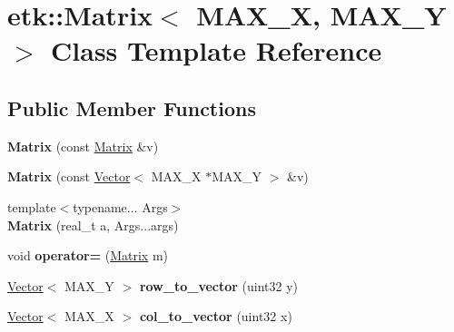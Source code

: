 \hypertarget{classetk_1_1_matrix}{\section{etk\-:\-:Matrix$<$ M\-A\-X\-\_\-\-X, M\-A\-X\-\_\-\-Y $>$ Class Template Reference}
\label{classetk_1_1_matrix}
}
\subsection*{Public Member Functions}
\begin{DoxyCompactItemize}
\item 
\hypertarget{classetk_1_1_matrix_a0242991f55f1e1696e59ea79831d3209}{{\bfseries Matrix} (const \hyperlink{classetk_1_1_matrix}{Matrix} \&v)}\label{classetk_1_1_matrix_a0242991f55f1e1696e59ea79831d3209}

\item 
\hypertarget{classetk_1_1_matrix_a5a291855a1c2bf5f83c151a2dbfc6c15}{{\bfseries Matrix} (const \hyperlink{classetk_1_1_vector}{Vector}$<$ M\-A\-X\-\_\-\-X $\ast$M\-A\-X\-\_\-\-Y $>$ \&v)}\label{classetk_1_1_matrix_a5a291855a1c2bf5f83c151a2dbfc6c15}

\item 
\hypertarget{classetk_1_1_matrix_a720277b96fac48caa56bb15e85d96aa1}{{\footnotesize template$<$typename... Args$>$ }\\{\bfseries Matrix} (real\-\_\-t a, Args...\-args)}\label{classetk_1_1_matrix_a720277b96fac48caa56bb15e85d96aa1}

\item 
\hypertarget{classetk_1_1_matrix_a31163e3aba16e2becc41e9b6810aaf56}{void {\bfseries operator=} (\hyperlink{classetk_1_1_matrix}{Matrix} m)}\label{classetk_1_1_matrix_a31163e3aba16e2becc41e9b6810aaf56}

\item 
\hypertarget{classetk_1_1_matrix_ac7c8c497a4112ca06de37b84106d6fb1}{\hyperlink{classetk_1_1_vector}{Vector}$<$ M\-A\-X\-\_\-\-Y $>$ {\bfseries row\-\_\-to\-\_\-vector} (uint32 y)}\label{classetk_1_1_matrix_ac7c8c497a4112ca06de37b84106d6fb1}

\item 
\hypertarget{classetk_1_1_matrix_a956a80781d2a63803e52ae2d7ced48a6}{\hyperlink{classetk_1_1_vector}{Vector}$<$ M\-A\-X\-\_\-\-X $>$ {\bfseries col\-\_\-to\-\_\-vector} (uint32 x)}\label{classetk_1_1_matrix_a956a80781d2a63803e52ae2d7ced48a6}


\end{DoxyCompactItemize}
